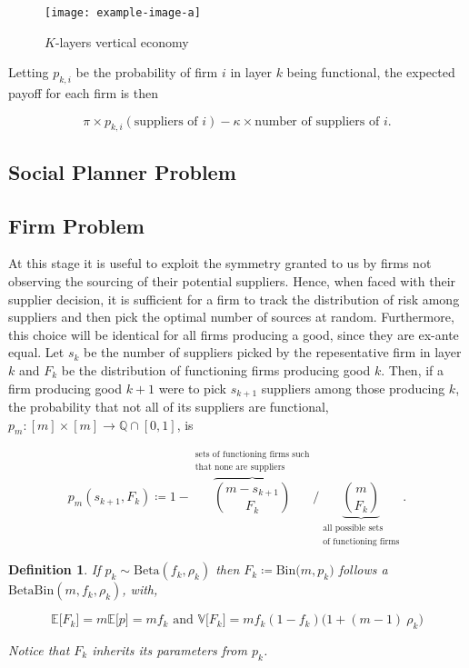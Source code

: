 \documentclass[american, abstract=on]{scrartcl}
\newcommand{\inputTikZ}[2]{%
        \scalebox{#1}{}  
      }
\theoremstyle{plain}
\newtheorem{definition}{Definition}
\newcommand{\E}{\mathbb{E}}
\newcommand{\V}{\mathbb{V}}
\newcommand{\Beta}{\text{Beta}}
\newcommand{\Bin}{\text{Bin}}
\begin{document}
\begin{figure}[H]
  \centering
  \texttt{[image: example-image-a]}
  \caption{$K$-layers vertical economy}
  \label{fig:vertical-economy-diagram}
\end{figure}

Letting $p_{k, i}$ be the probability of firm $i$ in layer $k$ being functional, the expected payoff for each firm is then

\begin{equation}
  \pi \times p_{k, i}(\text{suppliers of }i) - \kappa \times \text{number of suppliers of }i.
\end{equation}

\subsection{Social Planner Problem}


\subsection{Firm Problem}

At this stage it is useful to exploit the symmetry granted to us by firms not observing the sourcing of their potential suppliers. Hence, when faced with their supplier decision, it is sufficient for a firm to track the distribution of risk among suppliers and then pick the optimal number of sources at random. Furthermore, this choice will be identical for all firms producing a good, since they are ex-ante equal. Let $s_k$ be the number of suppliers picked by the repesentative firm in layer $k$ and $F_k$ be the distribution of functioning firms producing good $k$. Then, if a firm producing good $k + 1$ were to pick $s_{k + 1}$ suppliers among those producing $k$, the probability that not all of its suppliers are functional, $p_m : [m] \times [m] \to \mathbb{Q} \cap [0, 1]$, is

\begin{equation}
  p_m(s_{k + 1}, F_k) \coloneqq 1 - \overbrace{\binom{m - s_{k+1}}{F_k}}^{\substack{\text{sets of functioning firms such} \\ \text{that none are suppliers}}} \Bigg/ \underbrace{\binom{m}{F_k}}_{\substack{\text{all possible sets} \\ \text{of functioning firms}}}.
\end{equation}

\begin{definition} \label{definition:ptoF}
  If $p_k \sim \Beta(f_k, \rho_k)$ then $F_k \coloneqq \Bin\big(m, p_k \big)$ follows a $\Beta\Bin(m, f_k, \rho_k)$, with,

  \begin{equation} \label{eq:moments_of_F}
    \E \big[F_k\big] = m \E \big[p\big] = m f_k \text{ and } \V \big[F_k\big] = m f_k (1 - f_k) \big(1 + (m - 1) \ \rho_k\big)
  \end{equation}

  Notice that $F_k$ inherits its parameters from $p_k$.
\end{definition}
\end{document}
